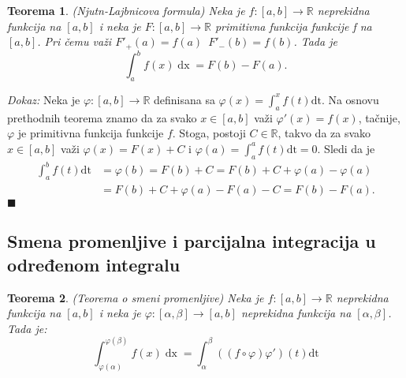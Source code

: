 \documentclass{article}
\newtheorem{teorema}{Teorema}[section]
\DeclareMathOperator{\dx}{dx}
\begin{document}
\begin{teoremabox}
    \label{teorema_2.9}
    \begin{teorema}
        (Njutn-Lajbnicova formula) Neka je $f:\left[a, b\right]\longrightarrow \mathbb{R}$ neprekidna funkcija na $\left[a,b\right]$ i neka je $F:\left[a, b\right]\longrightarrow\mathbb{R}$ primitivna funkcija funkcije f na $\left[a,b\right]$. Pri čemu važi $F'_+ \left(a\right) = f\left(a\right)\,\,\,F'_-\left(b\right) = f\left(b\right)$. Tada je
        $$ \int^b_a f\left(x\right)\dx = F\left(b\right) - F\left(a\right).$$
    \end{teorema}
\end{teoremabox}

\textit{Dokaz:} Neka je $\varphi: \left[a, b\right] \longrightarrow \mathbb{R}$ definisana sa
$\varphi\left(x\right) = \displaystyle\int^x_a f\left(t\right)\text{dt}$. Na osnovu prethodnih teorema znamo da za svako $x\in \left[a, b\right]$ važi $\varphi'\left(x\right) = f\left(x\right)$,
tačnije, $\varphi$ je primitivna funkcija funkcije $f$. Stoga, postoji
$C \in \mathbb{R}$, takvo da za svako $x \in \left[a, b\right]$ važi
$\varphi\left(x\right) = F\left(x\right) + C$ i $\displaystyle\varphi\left(a\right)=\int_{a}^{a} f\left(t\right)\text{dt}=0$. Sledi da je
\begin{align*}
    \displaystyle\int^b_a f\left(t\right)\text{dt} & = \varphi\left(b\right) = F\left(b\right) + C = F\left(b\right) +C+ \varphi\left(a\right) - \varphi\left(a\right) \\
                                                   & = F\left(b\right) +C+ \varphi\left(a\right) - F\left(a\right)-C = F\left(b\right) - F\left(a\right).
\end{align*}
\null\hfill $\blacksquare$\par

\subsection{Smena promenljive i parcijalna integracija u određenom integralu}

\begin{teoremabox}
    \label{teorema_2.10}
    \begin{teorema}
        (Teorema o smeni promenljive) Neka je $f:\left[a, b\right]\longrightarrow \mathbb{R}$ neprekidna funkcija na $\left[a,b\right]$ i neka je $\varphi: \left[\alpha, \beta\right] \longrightarrow \left[a, b\right]$ neprekidna funkcija na $\left[\alpha, \beta\right]$. Tada je:
        $$\displaystyle \int^{\varphi\left(\beta\right)}_{\varphi\left(\alpha\right)} f\left(x\right)\dx = \int^\beta_\alpha \left(\left(f\circ\varphi\right)\varphi'\right)\left(t\right)\text{dt}$$
    \end{teorema}
\end{teoremabox}
\end{document}
